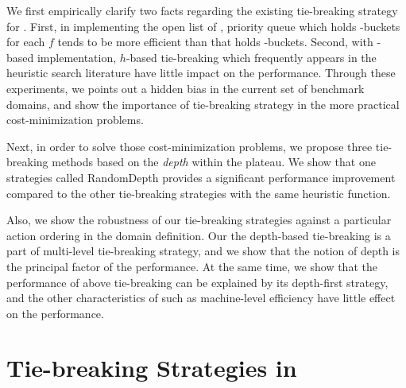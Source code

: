 We first empirically clarify two facts regarding the
existing tie-breaking strategy for \astar.
% 
First, in implementing the open list of \astar, priority queue which holds
\lifo-buckets for each $f$ tends to be more efficient than that holds \fifo-buckets.
% 
Second, with \lifo-based implementation, $h$-based tie-breaking which
frequently appears in the heuristic search literature have little
impact on the performance.
% 
Through these experiments, we points out a hidden bias in the current set of
benchmark domains, and show the importance of tie-breaking strategy in
the more practical cost-minimization problems.

Next, in order to solve those cost-minimization problems,
we propose three tie-breaking methods
based on the \emph{depth} within the plateau.
We show that one strategies called RandomDepth provides a significant performance improvement
compared to the other tie-breaking strategies with the same heuristic function.

Also, we show the robustness of our tie-breaking strategies
against a particular action ordering in the domain definition.
Our the depth-based tie-breaking is a part of multi-level tie-breaking strategy,
and we show that the notion of depth is the principal factor of the performance.
At the same time, we show that 
the performance of above \lifo tie-breaking can be explained by its
depth-first strategy, and the other characteristics of \lifo such as
machine-level efficiency have little effect on the performance.

\section{Tie-breaking Strategies in \astar}


